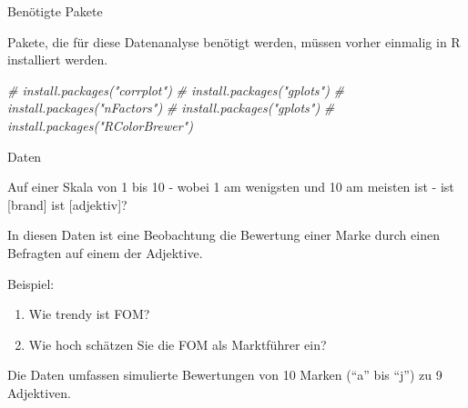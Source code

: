 \documentclass[12pt,ngerman,a4paper,ignorenonframetext,]{beamer}
\newenvironment{Shaded}{\begin{snugshade}}{\end{snugshade}}
\newcommand{\CommentTok}[1]{\textcolor[rgb]{0.56,0.35,0.01}{\textit{#1}}}
\providecommand{\tightlist}{%
  \setlength{\itemsep}{0pt}\setlength{\parskip}{0pt}}
\begin{document}
\begin{frame}[fragile]{Benötigte Pakete}
\protect\hypertarget{benotigte-pakete}{}

Pakete, die für diese Datenanalyse benötigt werden, müssen vorher
einmalig in R installiert werden.

\begin{Shaded}
\begin{Highlighting}[]
\CommentTok{# install.packages("corrplot")}
\CommentTok{# install.packages("gplots")}
\CommentTok{# install.packages("nFactors")}
\CommentTok{# install.packages("gplots")}
\CommentTok{# install.packages("RColorBrewer")}
\end{Highlighting}
\end{Shaded}

\end{frame}

\begin{frame}{Daten}
\protect\hypertarget{daten}{}

Auf einer Skala von 1 bis 10 - wobei 1 am wenigsten und 10 am meisten
ist - ist {[}brand{]} ist {[}adjektiv{]}?

In diesen Daten ist eine Beobachtung die Bewertung einer Marke durch
einen Befragten auf einem der Adjektive.

Beispiel:

\begin{enumerate}
\tightlist
\item
  Wie trendy ist FOM?
\item
  Wie hoch schätzen Sie die FOM als Marktführer ein?
\end{enumerate}

Die Daten umfassen simulierte Bewertungen von 10 Marken (``a'' bis
``j'') zu 9 Adjektiven.

\end{frame}
\end{document}
